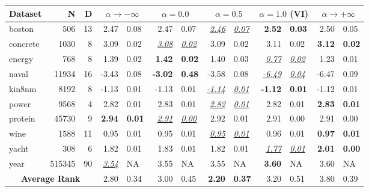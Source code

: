 \centering
{}
\label{tab:chap4_vrbound_bnn_ll}
\begin{tabular}{l@{\ica}r@{\ica}r@{\ica}r@{$\pm$}l@{\ica}r@{$\pm$}l@{\ica}r@{$\pm$}l@{\ica}r@{$\pm$}l@{\ica}r@{$\pm$}l@{\ica}}
\hline
\bf{Dataset}&{N}&{D}&\multicolumn{2}{c}{\bf{$\alpha \rightarrow -\infty$}}&\multicolumn{2}{c}{\bf{$\alpha = 0.0$}}&\multicolumn{2}{c}{\bf{$\alpha = 0.5$}}&\multicolumn{2}{c}{\bf{$\alpha = 1.0$ (VI)}}&\multicolumn{2}{c}{\bf{$\alpha \rightarrow +\infty$}}\\
\hline
boston&506&13&2.47&0.08&2.47&0.07&\underline{\textit{2.46}}&\underline{\textit{0.07}}&\textbf{2.52}&\textbf{0.03}&2.50&0.05\\
concrete&1030&8&3.09&0.02&\underline{\textit{3.08}}&\underline{\textit{0.02}}&3.09&0.02&3.11&0.02&\textbf{3.12}&\textbf{0.02}\\
energy&768&8&1.39&0.02&\textbf{1.42}&\textbf{0.02}&1.40&0.03&\underline{\textit{0.77}}&\underline{\textit{0.02}}&1.23&0.01\\
naval&11934&16&-3.43&0.08&\textbf{-3.02}&\textbf{0.48}&-3.58&0.08&\underline{\textit{-6.49}}&\underline{\textit{0.04}}&-6.47&0.09\\
kin8nm&8192&8&-1.13&0.01&-1.13&0.01&\underline{\textit{-1.14}}&\underline{\textit{0.01}}&\textbf{-1.12}&\textbf{0.01}&-1.12&0.01\\
power&9568&4&2.82&0.01&2.83&0.01&\underline{\textit{2.82}}&\underline{\textit{0.01}}&2.82&0.01&\textbf{2.83}&\textbf{0.01}\\
protein&45730&9&\textbf{2.94}&\textbf{0.01}&\underline{\textit{2.91}}&\underline{\textit{0.00}}&2.92&0.01&2.91&0.00&2.91&0.00\\
wine&1588&11&0.95&0.01&0.95&0.01&\underline{\textit{0.95}}&\underline{\textit{0.01}}&0.96&0.01&\textbf{0.97}&\textbf{0.01}\\
yacht&308&6&1.82&0.01&1.83&0.01&1.82&0.01&\underline{\textit{1.77}}&\underline{\textit{0.01}}&\textbf{2.01}&\textbf{0.00}\\
year&515345&90&\underline{\textit{3.54}}&NA&3.55&NA&3.55&NA&\textbf{3.60}&NA&3.60&NA\\
\hline
\multicolumn{3}{c}{\textbf{Average Rank}}&2.80&0.34&3.00&0.45&\textbf{2.20}&\textbf{0.37}&3.20&0.51&3.80&0.39\\
\hline
\end{tabular}
